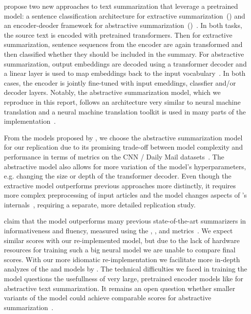 \citeauthor{LiuL2019} propose two new approaches to text summarization that leverage a pretrained \Bert model: a sentence classification architecture for extractive summarization~(\BertSumExt) and an encoder-deoder framework for abstractive summarization~(\BertSumAbs)~\cite{LiuL2019}.
In both tasks, the source text is encoded with pretrained \Bert transformers. Then for extractive summarization, sentence sequences from the \Bert encoder are again transformed and then classified whether they should be included in the summary.
For abstractive summarization, \Bert output embeddings are decoded using a transformer decoder and a linear layer is used to map embeddings back to the input vocabulary~\cite{LiuL2019}. In both cases, the \Bert encoder is jointly fine-tuned with input emeddings, classfier and/or decoder layers.
Notably, the abstractive summarization model, which we reproduce in this report,
follows an architecture very similar to neural machine translation and a neural machine translation toolkit is used in many parts of the \BertSumAbs implementation~\cite{KleinKDSR2017}.

From the models proposed by \citeauthor{LiuL2019}, we choose the \BertSumAbs abstractive summarization model for our replication due to its promising trade-off between model complexity and performance in terms of \Rouge metrics on the CNN / Daily Mail datasets~\cite{LiuL2019,HermannKGEKSB2015}. The abstractive model also allows for more variation of the model's hyperparameters, e.g. changing the size or depth of the transformer decoder. 
Even though the extractive model \BertSumExt outperforms previous approaches more  distinctly, it requires more complex preprocessing of input articles and the model changes aspects of \Bert's internals~\cite{LiuL2019}, requiring a separate, more detailed replication study.

\citeauthor{LiuL2019} claim that the \BertSumAbs model outperforms many previous state-of-the-art summarizers in informativeness and fluency, measured using the , , and \RougeL metrics~\cite{LiuL2019,Lin2004}.
We expect similar scores with our re-implemented model, but due to the lack of hardware resources for training such a big neural model we are unable to compare final \Rouge scores.
With our more idiomatic re-implementation we facilitate more in-depth analyzes of the \BertSumAbs and \TransformerAbs models by \citeauthor{LiuL2019}.
The technical difficulties we faced in training the \BertSumAbs model questions the usefullness of very large, pretrained encoder models like \Bert for abstractive text summarization. It remains an open question whether smaller variants of the \Bert model could achieve comparable \Rouge scores for abstractive summarization~\cite{TurcCLT2019}.
